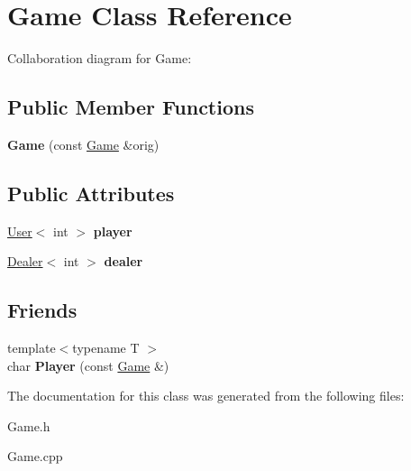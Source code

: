 \hypertarget{class_game}{}\section{Game Class Reference}
\label{class_game}


Collaboration diagram for Game\+:
\subsection*{Public Member Functions}
\begin{DoxyCompactItemize}
\item 
\mbox{\label{class_game_a281aed570fda4fd98eb9060f516bf707}} 
{\bfseries Game} (const \mbox{\hyperlink{class_game}{Game}} \&orig)
\end{DoxyCompactItemize}
\subsection*{Public Attributes}
\begin{DoxyCompactItemize}
\item 
\mbox{\label{class_game_a85bfdfa598b1ac840c739dd8e5ef7b6d}} 
\mbox{\hyperlink{class_user}{User}}$<$ int $>$ {\bfseries player}
\item 
\mbox{\label{class_game_a4c61a51d11d4e6ab3e92e8c8bb0b9750}} 
\mbox{\hyperlink{class_dealer}{Dealer}}$<$ int $>$ {\bfseries dealer}
\end{DoxyCompactItemize}
\subsection*{Friends}
\begin{DoxyCompactItemize}
\item 
\mbox{\label{class_game_a06779f77c39a03fcdbb2f92aa18f3994}} 
{\footnotesize template$<$typename T $>$ }\\char {\bfseries Player} (const \mbox{\hyperlink{class_game}{Game}} \&)
\end{DoxyCompactItemize}


The documentation for this class was generated from the following files\+:\begin{DoxyCompactItemize}
\item 
Game.\+h\item 
Game.\+cpp\end{DoxyCompactItemize}
